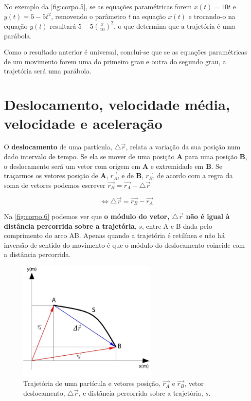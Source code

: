 \documentclass[a4paper,11pt,oneside]{report}
\begin{document}
No exemplo da \autoref{fig:corpo.5}, se as equações paramétricas forem
\(x(t) = 10t\) e \(y(t) = 5-5t^2\), removendo o parâmetro \textit{t}
na equação \(x(t)\) e trocando-o na equação \(y(t)\) resultará \(5-5(\frac{x}{10} )^2\), o que
determina que a trajetória é uma parábola.

Como o resultado anterior é universal, conclui-se que se as equações paramétricas de um movimento forem uma do primeiro 
grau e outra do segundo grau, a trajetória será uma parábola.

\chapter{Deslocamento, velocidade média, velocidade e aceleração}
\label{chap.deslocamento}

O \textbf{deslocamento} de uma partícula, $\bigtriangleup\overrightarrow{r}$, relata a variação da sua posição num dado intervalo de tempo. 
Se ela se mover de uma posição \textbf{A} para uma posição \textbf{B}, o deslocamento será um vetor com origem em \textbf{A} e extremidade em \textbf{B}. 
Se traçarmos os vetores posição de \textbf{A}, $\overrightarrow{r_A}$,  e de \textbf{B}, $\overrightarrow{r_B}$,  de acordo com a regra da soma de vetores podemos escrever $\overrightarrow{r_B}=\overrightarrow{r_A}+\bigtriangleup\overrightarrow{r}$

\[
    \Leftrightarrow \bigtriangleup\overrightarrow{r}=\overrightarrow{r_B}-\overrightarrow{r_A}   
\]

Na \autoref{fig:corpo.6} podemos ver que \textbf{o módulo do vetor, $\bigtriangleup\overrightarrow{r}$  não é igual à distância percorrida sobre a trajetória}, $s$, entre A e B dada 
pelo comprimento do arco AB. Apenas quando a trajetória é retilínea e não há inversão de sentido do movimento é que o módulo 
do deslocamento coincide com a distância percorrida.

\begin{figure}[H]
    \center
    \includegraphics[height=170pt]{figuras/Fig 3.1.jpg}
    \caption{Trajetória de uma partícula e vetores posição, $\overrightarrow{r_A}$ e $\overrightarrow{r_B}$, vetor deslocamento, $\bigtriangleup\overrightarrow{r}$, e distância
    percorrida sobre a trajetória, $s$.}
    \label{fig:corpo.6}
\end{figure}
\end{document}
